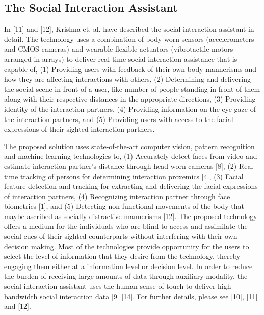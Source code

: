 \documentclass{article} %
\begin{document}
\vspace{-0.1in}
\subsection{The Social Interaction Assistant}
\vspace{-0.13in}
In [11] and [12], Krishna et. al. have described the social interaction assistant in detail. The technology uses a combination of body-worn sensors (accelerometers and CMOS cameras) and wearable flexible actuators (vibrotactile motors arranged in arrays) to deliver real-time social interaction assistance that is capable of, (1) Providing users with feedback of their own body mannerisms and how they are affecting interactions with others, (2) Determining and delivering the social scene in front of a user, like number of people standing in front of them along with their respective distances in the appropriate directions, (3) Providing identity of the interaction partners, (4) Providing information on the eye gaze of the interaction partners, and (5) Providing users with access to the facial expressions of their sighted interaction partners.

The proposed solution uses state-of-the-art computer vision, pattern recognition and machine learning technologies to, (1) Accurately detect faces from video and estimate interaction partner's distance through head-worn cameras [8], (2) Real-time tracking of persons for determining interaction proxemics [4], (3) Facial feature detection and tracking for extracting and delivering the facial expressions of interaction partners, (4) Recognizing interaction partner through face biometrics [1], and (5) Detecting non-functional movements of the body that maybe ascribed as socially distractive mannerisms [12]. The proposed technology offers a medium for the individuals who are blind to access and assimilate the social cues of their sighted counterparts without interfering with their own decision making. Most of the technologies provide opportunity for the users to select the level of information that they desire from the technology, thereby engaging them either at a information level or decision level. In order to reduce the burden of receiving large amounts of data through auxiliary modality, the social interaction assistant uses the human sense of touch to deliver high-bandwidth social interaction data [9] [14]. For further details, please see [10], [11] and [12].
\end{document}
